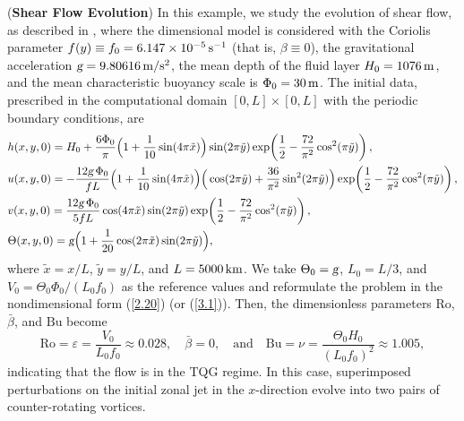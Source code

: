 \documentclass[a4paper,11pt,twoside]{article}
\numberwithin{equation}{section}
\numberwithin{figure}{section}
\numberwithin{table}{section}
\newcommand{\hf}{\frac{1}{2}}
\newcommand{\eps}{\varepsilon}
\newcommand{\g}{\textsl{g}}
\newcommand{\Ro}{\mathrm{Ro}}
\newcommand{\Bu}{\mathrm{Bu}}
\newcommand\eref[1]{(\ref{#1})}
\begin{document}
\begin{example}({\bf Shear Flow Evolution})
In this example, we study the evolution of shear flow, as described in \cite{Bauer_2019,Zhang_2024}, where the dimensional model is
considered with the Coriolis parameter $f(y)\equiv f_0=6.147\times10^{-5}\,{\rm s^{-1}}$ (that is, $\beta\equiv0$), the gravitational
acceleration $\g=9.80616\,{\rm m/s^2}$, the mean depth of the fluid layer $H_0=1076\,{\rm m}$, and the mean characteristic buoyancy scale is
$\Phi_0=30\,{\rm m}$. The initial data, prescribed in the computational domain $[0,L]\times[0,L]$ with the periodic boundary conditions, are
\begin{equation}
\begin{aligned}
&h(x,y,0)=H_0+\frac{6\Phi_0}{\pi}\Big(1+\frac{1}{10}\sin(4\pi\tilde x)\Big)\sin(2\pi\tilde y)
\exp\!\left(\hf-\frac{72}{\pi^2}\cos^2(\pi\tilde y)\right),\\
&u(x,y,0)=-\frac{12\g\,\Phi_0}{fL}\Big(1+\frac{1}{10}\sin(4\pi\tilde x)\Big)
\Big(\cos(2\pi\tilde y)+\frac{36}{\pi^2}\sin^2(2\pi\tilde y)\Big)\exp\!\left(\hf-\frac{72}{\pi^2}\cos^2(\pi\tilde y)\right),\\
&v(x,y,0)=\frac{12\g\,\Phi_0}{5fL}\cos(4\pi\tilde x)\sin(2\pi\tilde y)\exp\!\left(\hf-\frac{72}{\pi^2}\cos^2(\pi\tilde y)\right),\\
&\Theta(x,y,0)=\g\Big(1+\frac{1}{20}\cos(2\pi\tilde x)\sin(2\pi\tilde y)\Big),
\end{aligned}
\label{5.2}
\end{equation}
where $\tilde x=x/L$, $\tilde y=y/L$, and $L=5000\,{\rm km}$. We take $\Theta_0=\g$, $L_0=L/3$, and $V_0=\Theta_0\Phi_0/(L_0f_0)$ as the
reference values and reformulate the problem in the nondimensional form \eref{2.20} (or \eref{3.1}). Then, the dimensionless parameters
$\Ro$, $\bar\beta$, and $\Bu$ become
\begin{equation*}
\Ro=\eps=\frac{V_0}{L_0f_0}\approx0.028,\quad\bar\beta=0,\quad\mbox{and}\quad\Bu=\nu=\frac{\Theta_0H_0}{(L_0f_0)^2}\approx1.005,
\end{equation*}
indicating that the flow is in the TQG regime. In this case, superimposed perturbations on the initial zonal jet in the $x$-direction evolve
into two pairs of counter-rotating vortices. 
	

\end{example}
\end{document}

